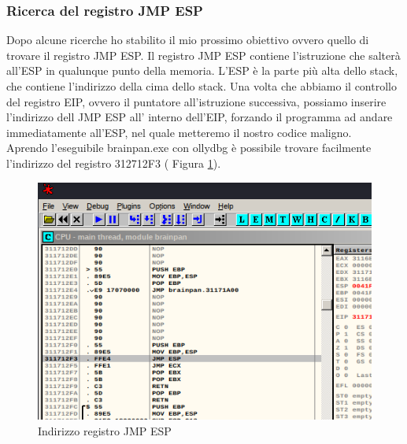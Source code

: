 \documentclass[12pt,letterpaper]{article} %
\begin{document}

\subsubsection{Ricerca del registro JMP ESP}
Dopo alcune ricerche ho stabilito il mio prossimo obiettivo ovvero quello di trovare il registro JMP ESP. Il registro JMP ESP contiene l’istruzione che salterà all’ESP in qualunque punto della memoria. L'ESP è la parte più alta dello stack, che contiene l’indirizzo della cima dello stack. Una volta che abbiamo il controllo del registro EIP, ovvero il puntatore all’istruzione successiva, possiamo inserire l’indirizzo dell JMP ESP all’ interno dell’EIP, forzando il programma ad andare immediatamente all’ESP, nel quale metteremo il nostro codice maligno.\\
Aprendo l'eseguibile brainpan.exe con ollydbg è possibile trovare facilmente l'indirizzo del registro 312712F3 ( Figura \ref{fig:jmpesp}).
\begin{figure}[h!]
  \centering
  \includegraphics[width=\textwidth]{JMP ESP.png}
  \caption{Indirizzo registro JMP ESP}
  \label{fig:jmpesp}
\end{figure}
\end{document}

